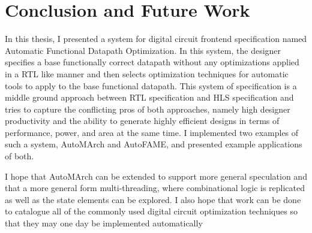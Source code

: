 \section{Conclusion and Future Work}
In this thesis, I presented a system for digital circuit frontend specification named Automatic Functional Datapath Optimization. In this system, the designer specifies a base functionally correct datapath without any optimizations applied in a RTL like manner and then selects optimization techniques for automatic tools to apply to the base functional datapath. This system of specification is a middle ground approach between RTL specification and HLS specification and tries to capture the conflicting pros of both approaches, namely high designer productivity and the ability to generate highly efficient designs in terms of performance, power, and area at the same time. I implemented two examples of such a system, AutoMArch and AutoFAME, and presented example applications of both.

I hope that AutoMArch can be extended to support more general speculation and that a more general form multi-threading, where combinational logic is replicated as well as the state elements can be explored. I also hope that work can be done to catalogue all of the commonly used digital circuit optimization techniques so that they may one day be implemented automatically

